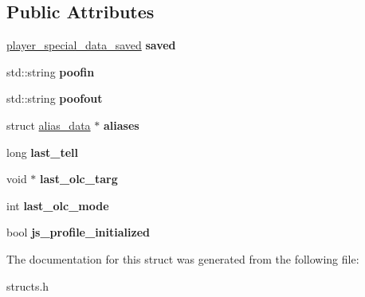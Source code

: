 \subsection*{Public Attributes}
\begin{DoxyCompactItemize}
\item 
\mbox{\label{structplayer__special__data_a4d963714b3e3d5c66935ca294fa70246}} 
\hyperlink{structplayer__special__data__saved}{player\+\_\+special\+\_\+data\+\_\+saved} {\bfseries saved}
\item 
\mbox{\label{structplayer__special__data_a3a9d353d5576376ff3cb135f1169f2e5}} 
std\+::string {\bfseries poofin}
\item 
\mbox{\label{structplayer__special__data_a4d351862a766eb53192ec15fec7a0d73}} 
std\+::string {\bfseries poofout}
\item 
\mbox{\label{structplayer__special__data_a5898c839f335315cad13be7abd55c85b}} 
struct \hyperlink{structalias__data}{alias\+\_\+data} $\ast$ {\bfseries aliases}
\item 
\mbox{\label{structplayer__special__data_ac6db93f8bdcfa2fabfe937b6173e2f47}} 
long {\bfseries last\+\_\+tell}
\item 
\mbox{\label{structplayer__special__data_a45ee745cd86410751735af684337f15a}} 
void $\ast$ {\bfseries last\+\_\+olc\+\_\+targ}
\item 
\mbox{\label{structplayer__special__data_ad3e3465c757dbb6285bd5072af390be1}} 
int {\bfseries last\+\_\+olc\+\_\+mode}
\item 
\mbox{\label{structplayer__special__data_a6f677eef177ebf20c357d5b4722f32ec}} 
bool {\bfseries js\+\_\+profile\+\_\+initialized}
\end{DoxyCompactItemize}


The documentation for this struct was generated from the following file\+:\begin{DoxyCompactItemize}
\item 
structs.\+h\end{DoxyCompactItemize}
